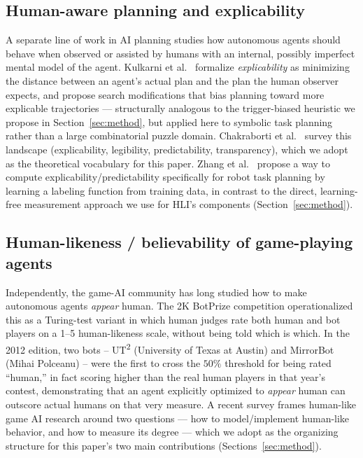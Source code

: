 \documentclass[10pt,conference]{article}
\begin{document}
\subsection{Human-aware planning and explicability}
A separate line of work in AI planning studies how autonomous agents
should behave when observed or assisted by humans with an internal,
possibly imperfect mental model of the agent. Kulkarni et
al.\ \citep{kulkarni2016} formalize \emph{explicability} as
minimizing the distance between an agent's actual plan and the plan
the human observer expects, and propose search modifications that
bias planning toward more explicable trajectories --- structurally
analogous to the trigger-biased heuristic we propose in
Section~\ref{sec:method}, but applied here to symbolic task planning
rather than a large combinatorial puzzle domain. Chakraborti et
al.\ \citep{chakraborti2019} survey this landscape (explicability,
legibility, predictability, transparency), which we adopt as the
theoretical vocabulary for this paper. Zhang et al.\ \citep{zhang2017}
propose a way to compute explicability/predictability specifically for
robot task planning by learning a labeling function from training
data, in contrast to the direct, learning-free measurement approach we
use for HLI's components (Section~\ref{sec:method}).

\subsection{Human-likeness / believability of game-playing agents}
Independently, the game-AI community has long studied how to make
autonomous agents \emph{appear} human. The 2K BotPrize competition
\citep{hingston2009} operationalized this as a Turing-test variant in
which human judges rate both human and bot players on a 1--5
human-likeness scale, without being told which is which. In the 2012
edition, two bots -- UT\textsuperscript{2} (University of Texas at
Austin) and MirrorBot (Mihai Polceanu) -- were the first to cross the
$50\%$ threshold for being rated ``human,'' in fact scoring higher
than the real human players in that year's contest, demonstrating that
an agent explicitly optimized to \emph{appear} human can outscore
actual humans on that very measure. A recent survey \citep{humanlike2025}
frames human-like game AI research around two questions --- how to
model/implement human-like behavior, and how to measure its degree
--- which we adopt as the organizing structure for this paper's two
main contributions (Sections~\ref{sec:method}).
\end{document}
